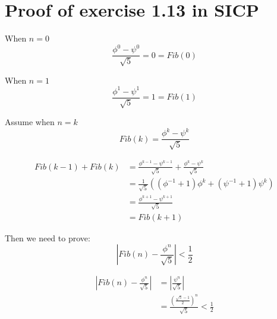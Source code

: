 \documentclass{article}
\begin{document}
\section*{Proof of exercise 1.13 in SICP}


When $n=0$
\begin{equation*}
	\frac{\phi^0-\psi^0}{\sqrt{5}} = 0 = Fib(0)
\end{equation*}

When $n=1$
\begin{equation*}
	\frac{\phi^1-\psi^1}{\sqrt{5}} = 1 = Fib(1)
\end{equation*}

Assume when $n=k$
\begin{equation*}
	Fib(k) = \frac{\phi^k-\psi^k}{\sqrt{5}}
\end{equation*}

\begin{align*}
	Fib(k-1) + Fib(k) 
	& = \frac{\phi^{k-1}-\psi^{k-1}}{\sqrt{5}} + \frac{\phi^k-\psi^k}{\sqrt{5}} \\
	& = \frac{1}{\sqrt{5}} \left ( \left ( \phi^{-1}+1 \right )\phi^k + \left ( \psi^{-1}+1 \right )\psi^k \right ) \\
	& = \frac{\phi^{k+1}-\psi^{k+1}}{\sqrt{5}} \\
	& = Fib(k+1)
\end{align*}

Then we need to prove:
\begin{equation*}
	\left | Fib(n)-\frac{\phi^n}{\sqrt{5}}\right | < \frac{1}{2}
\end{equation*}

\begin{align*}
	\left | Fib(n)-\frac{\phi^n}{\sqrt{5}} \right | & = \left | \frac{\psi^n}{\sqrt{5}} \right | \\
	& = \frac{ \left ( \frac{\sqrt{5}-1}{2} \right )^n }{\sqrt{5}} < \frac{1}{2}
\end{align*}
\end{document}
